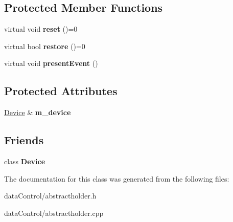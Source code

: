 \subsection*{Protected Member Functions}
\begin{DoxyCompactItemize}
\item 
\hypertarget{class_tempest_1_1_abstract_holder_base_a1293a281f8e570a363cd40f2a8e2c226}{virtual void {\bfseries reset} ()=0}\label{class_tempest_1_1_abstract_holder_base_a1293a281f8e570a363cd40f2a8e2c226}

\item 
\hypertarget{class_tempest_1_1_abstract_holder_base_a7a02232061d5d98ae1760482dfb8e031}{virtual bool {\bfseries restore} ()=0}\label{class_tempest_1_1_abstract_holder_base_a7a02232061d5d98ae1760482dfb8e031}

\item 
\hypertarget{class_tempest_1_1_abstract_holder_base_ac50ce07eb80c2d47a0704becd0e99fbd}{virtual void {\bfseries present\+Event} ()}\label{class_tempest_1_1_abstract_holder_base_ac50ce07eb80c2d47a0704becd0e99fbd}

\end{DoxyCompactItemize}
\subsection*{Protected Attributes}
\begin{DoxyCompactItemize}
\item 
\hypertarget{class_tempest_1_1_abstract_holder_base_a6a8cc8e516aee275a4d14a08c955eb70}{\hyperlink{class_tempest_1_1_device}{Device} \& {\bfseries m\+\_\+device}}\label{class_tempest_1_1_abstract_holder_base_a6a8cc8e516aee275a4d14a08c955eb70}

\end{DoxyCompactItemize}
\subsection*{Friends}
\begin{DoxyCompactItemize}
\item 
\hypertarget{class_tempest_1_1_abstract_holder_base_a520fa05e0bf58785da428f7a0241eee2}{class {\bfseries Device}}\label{class_tempest_1_1_abstract_holder_base_a520fa05e0bf58785da428f7a0241eee2}

\end{DoxyCompactItemize}


The documentation for this class was generated from the following files\+:\begin{DoxyCompactItemize}
\item 
data\+Control/abstractholder.\+h\item 
data\+Control/abstractholder.\+cpp\end{DoxyCompactItemize}
